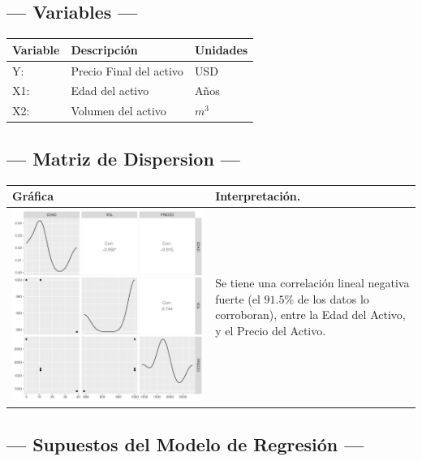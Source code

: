 \subsection{\centering --- Variables ---} %
\begin{center}
  \begin{tabular}{|l|l|l|}
    \hline 
    Variable & Descripción   & Unidades\\ \hline 
    Y:  & Precio Final del activo  & USD \\ \hline 
    X1: & Edad del activo    & Años \\ \hline 
		X2: & Volumen del activo & \(m ^ 3\) \\ \hline 
  \end{tabular}
\end{center} 

\subsection{\centering --- Matriz de Dispersion ---} %
\begin{center}
  \begin{tabular}{|p{11cm}|p{5cm}|}
    \hline
    Gráfica & Interpretación. \\ \hline 
    \begin{minipage}{\textwidth}
    \includegraphics[width= 0.5 \linewidth, page=1]{../0.documentos/3_MERGED_MARKET/1_TANQUE/r/Rplots.pdf}
    \end{minipage} 
    &
		Se tiene una correlación lineal negativa fuerte (el \(91.5\%\) de los datos lo corroboran),
		entre la Edad del Activo, y el Precio del Activo.
		\\ \hline 
  \end{tabular}
\end{center} 

\subsection{\centering --- Supuestos del Modelo de Regresión ---} %

